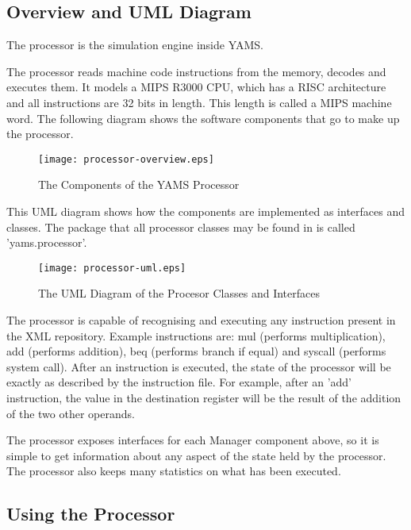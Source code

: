 
\subsection{Overview and UML Diagram}

The processor is the simulation engine inside YAMS. 

The processor reads machine code instructions from the memory, decodes and executes them. It models a MIPS R3000 CPU, which has a RISC architecture and all instructions are 32 bits in length. This length is called a MIPS machine word. The following diagram shows the software components that go to make up the processor.

\begin{figure}
\begin{center}
\texttt{[image: processor-overview.eps]}
\caption{The Components of the YAMS Processor}
\end{center}
\end{figure}

This UML diagram shows how the components are implemented as interfaces and classes. The package that all processor classes may be found in is called 'yams.processor'.

\begin{figure}[p]
\begin{center}
\texttt{[image: processor-uml.eps]}
\caption{The UML Diagram of the Procesor Classes and Interfaces}
\end{center}
\end{figure}


The processor is capable of recognising and executing any instruction present in the XML repository. Example instructions are: mul (performs multiplication), add (performs addition), beq (performs branch if equal) and syscall (performs system call). After an instruction is executed, the state of the processor will be exactly as described by the instruction file. For example, after an 'add' instruction, the value in the destination register will be the result of the addition of the two other operands.

The processor exposes interfaces for each Manager component above, so it is simple to get information about any aspect of the state held by the processor. The processor also keeps many statistics on what has been executed.


\subsection{Using the Processor}

